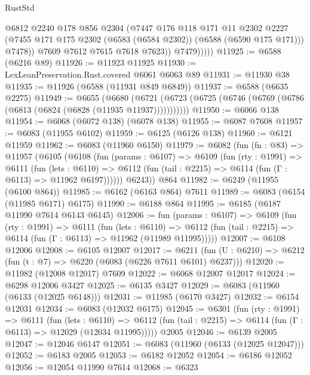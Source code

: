 \begin{lexlean}{RustStd}
\begin{coremodule}
                    @6812
                    @2240
                    @178
                    @856
                    @2304
                    (@7447
                      @176
                      @118
                      @171
                      @11
                      @2302
                      @2227
                      (@7455 @171 @175 @2302 (@6583 (@6584 @2302)) (@6588 (@6590 @175 @171)))
                      @7478))
                  @7609
                  @7612
                  @7615
                  @7618
                  @7623))
              @7479)))))
@11925 := @6588 (@6216 @89)
@11926 := @11923 @11925
@11930 := LexLeanPreservation.Rust.covered @6061 @6063 @89
@11931 := @11930 @38
@11935 := @11926 (@6588 (@11931 @849 @6849))
@11937 := @6588 (@6635 @2275)
@11949 := @6655
    (@6680 (@6721 (@6723 (@6725 (@6746 (@6769 (@6786 (@6813 (@6824 (@6828 (@11935 @11937)))))))))))
@11950 := @6066 @138
@11954 := @6068 (@6072 @138) (@6078 @138)
@11955 := @6087 @7608
@11957 := @6083 (@11955 @6102)
@11959 := @6125 (@6126 @138)
@11960 := @6121 @11959
@11962 := @6083 (@11960 @6150)
@11979 := @6082
    (fun (fn : @83) =>
    @11957
      (@6105
        (@6108
          (fun (params : @6107) =>
          @6109
            (fun (rty : @1991) =>
            @6111
              (fun (lets : @6110) =>
              @6112 (fun (tail : @2215) => @6114 (fun (Γ : @6113) => @11962 @6197))))))
        @6243))
    @864
@11982 := @6249 (@11955 (@6100 @864))
@11985 := @6162 (@6163 @864) @7611
@11989 := @6083 (@6154 (@11985 @6171) @6175)
@11990 := @6188 @864
@11995 := @6185 (@6187 @11990 @7614 @6143 @6145)
@12006 := fun (params : @6107) =>
  @6109
    (fun (rty : @1991) =>
    @6111
      (fun (lets : @6110) =>
      @6112 (fun (tail : @2215) => @6114 (fun (Γ : @6113) => @11962 (@11989 @11995)))))
@12007 := @6108 @12006
@12008 := @6105 @12007
@12017 := @6211 (fun (U : @6210) => @6212 (fun (t : @7) => @6220 (@6083 (@6226 @7611 @6101) @6237)))
@12020 := @11982 (@12008 @12017) @7609
@12022 := @6068 @12007 @12017
@12024 := @6298 @12006 @3427
@12025 := @6135 @3427
@12029 := @6083 (@11960 (@6133 (@12025 @6148)))
@12031 := @11985 (@6170 @3427)
@12032 := @6154 @12031
@12034 := @6083 (@12032 @6175)
@12045 := @6301
    (fun (rty : @1991) =>
    @6111
      (fun (lets : @6110) =>
      @6112 (fun (tail : @2215) => @6114 (fun (Γ : @6113) => @12029 (@12034 @11995)))))
    @2005
@12046 := @6139 @2005
@12047 := @12046 @6147
@12051 := @6083 (@11960 (@6133 (@12025 @12047)))
@12052 := @6183 @2005
@12053 := @6182 @12052
@12054 := @6186 @12052
@12056 := @12054 @11990 @7614
@12068 := @6323

\end{coremodule}
\end{lexlean}
